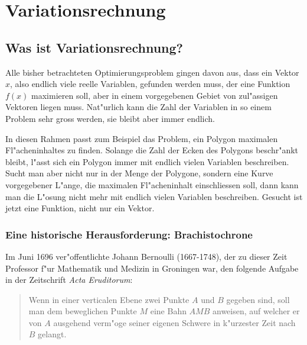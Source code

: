 \chapter{Variationsrechnung\label{chapter-variationsrechnung}}

\section{Was ist Variationsrechnung?}
Alle bisher betrachteten Optimierungsproblem gingen davon aus, dass
ein Vektor $x$, also endlich viele reelle Variablen, gefunden werden muss,
der eine Funktion $f(x)$ maximieren soll, aber in einem vorgegebenen
Gebiet von zul"assigen Vektoren liegen muss. 
Nat"urlich kann die Zahl der Variablen in so einem Problem sehr gross werden,
sie bleibt aber immer endlich.

In diesen Rahmen passt zum Beispiel das Problem, ein Polygon
maximalen Fl"acheninhaltes zu finden. Solange die Zahl der Ecken
des Polygons beschr"ankt bleibt, l"asst sich ein Polygon immer mit
endlich vielen Variablen beschreiben. Sucht man aber nicht nur in
der Menge der Polygone, sondern eine Kurve vorgegebener L"ange,
die maximalen Fl"acheninhalt einschliessen soll, dann kann man
die L"osung nicht mehr mit endlich vielen Variablen beschreiben.
Gesucht ist jetzt eine Funktion, nicht nur ein Vektor.

\subsection{Eine historische Herausforderung: Brachistochrone}
Im Juni 1696 ver"offentlichte Johann Bernoulli (1667-1748), der
zu dieser Zeit Professor f"ur Mathematik und Medizin in Groningen
war, den folgende Aufgabe in der Zeitschrift {\it Acta Eruditorum}:

\begin{quote}
Wenn in einer verticalen Ebene zwei Punkte $A$ und $B$ gegeben sind,
soll man dem beweglichen Punkte $M$ eine Bahn $AMB$ anweisen, auf welcher
er von $A$ ausgehend verm"oge seiner eigenen Schwere in k"urzester Zeit
nach $B$ gelangt.
\end{quote}


